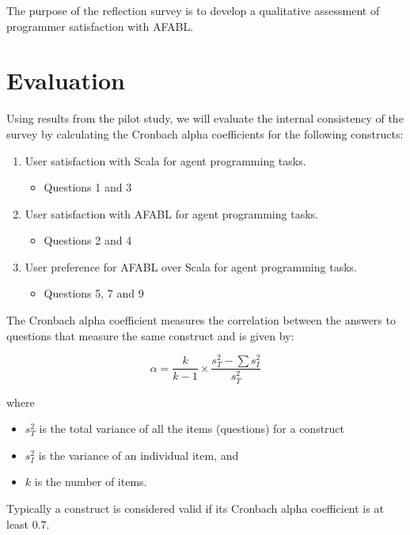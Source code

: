 \begin{appendices}
 The purpose of the reflection survey is to develop a qualitative assessment of programmer satisfaction with AFABL.

\section{Evaluation}

Using results from the pilot study, we will evaluate the internal consistency of the survey by calculating the Cronbach alpha coefficients for the following constructs:

\begin{enumerate}

\item User satisfaction with Scala for agent programming tasks.
\begin{itemize}
\item Questions 1 and 3
\end{itemize}

\item User satisfaction with AFABL for agent programming tasks.
\begin{itemize}
\item  Questions 2 and 4
\end{itemize}

\item User preference for AFABL over Scala for agent programming tasks.
\begin{itemize}
\item Questions 5, 7 and 9
\end{itemize}

\end{enumerate}

The Cronbach alpha coefficient measures the correlation between the answers to questions that measure the same construct and is given by:

\[
\alpha = \frac{k}{k - 1} \times \frac{s_{T}^{2} - \sum s_{I}^{2}}{s_{T}^{2}}
\]

where
\begin{itemize}
\item $s_T^2$ is the total variance of all the items (questions) for a construct
\item $s_I^2$ is the variance of an individual item, and
\item $k$ is the number of items.
\end{itemize}

Typically a construct is considered valid if its Cronbach alpha coefficient is at least 0.7.




\end{appendices}
